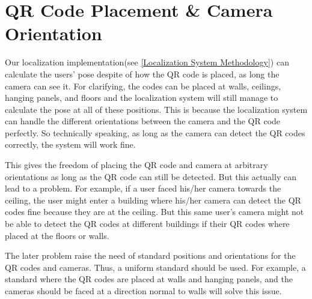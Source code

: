 \section{QR Code Placement \& Camera Orientation}
Our localization implementation(see \ref{Localization System Methodology}) can calculate the users' pose despite of how the QR code is placed, as long the camera can see it. For clarifying, the codes can be placed at walls, ceilings, hanging panels, and floors and the localization system will still manage to calculate the pose at all of these positions. This is because the localization system can handle the different orientations between the camera and the QR code perfectly. So technically speaking, as long as the camera can detect the QR codes correctly, the system will work fine.

This gives the freedom of placing the QR code and camera at arbitrary orientations as long as the QR code can still be detected. But this actually can lead to a problem. For example, if a user faced his/her camera towards the ceiling, the user might enter a building where his/her camera can detect the QR codes fine because they are at the ceiling. But this same user's camera might not be able to detect the QR codes at different buildings if their QR codes where placed at the floors or walls.

The later problem raise the need of standard positions and orientations for the QR codes and cameras. Thus, a uniform standard should be used. For example, a standard where the QR codes are placed at walls and hanging panels, and the cameras should be faced at a direction normal to walls will solve this issue.